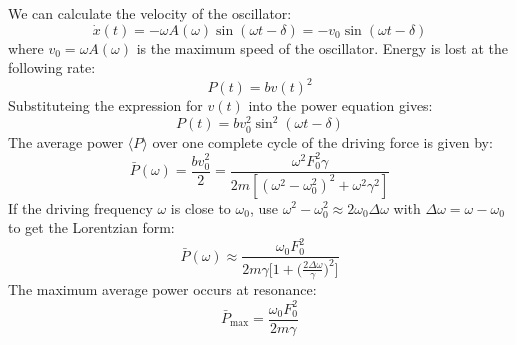 \documentclass[11pt]{report}
\begin{document}
\begin{definition} 
    We can calculate the velocity of the oscillator:
    \begin{equation}
        \dot{x}(t) = -\omega A(\omega) \sin(\omega t - \delta) = -v_0 \sin(\omega t - \delta)
    \end{equation}
    where \( v_0 = \omega A(\omega) \) is the maximum speed of the oscillator. Energy is lost at the following rate:
    \begin{equation}
        P(t) = b v(t)^2 
    \end{equation}
    Substituteing the expression for \( v(t) \) into the power equation gives:
    $$
        P(t) = b v_0^2 \sin^2(\omega t - \delta)
    $$
    The average power \( \langle P \rangle \) over one complete cycle of the driving force is given by:
   \begin{equation}
        \bar{P}(\omega) = \frac{b v_0^2}{2} = \frac{\omega^2 F_0^2 \gamma}{2m \left[(\omega^2 - \omega_0^2)^2 + \omega^2 \gamma^2\right]}
   \end{equation}
    If the driving frequency \( \omega \) is close to \( \omega_0 \), use $\omega^2 - \omega_0^2 \approx 2\omega_0\Delta \omega$ with $\Delta \omega = \omega - \omega_0$ to get the Lorentzian form:
    \begin{equation}
        \bar{P}(\omega) \approx \frac{\omega_0 F_0^2}{2m \gamma \Big[ 1 + \big(\tfrac{2\Delta \omega}{\gamma}\big)^2 \Big]}
    \end{equation}
    The maximum average power occurs at resonance:
    \begin{equation}
        \bar{P}_{\text{max}} = \frac{\omega_0 F_0^2}{2m \gamma}
    \end{equation}
\end{definition}
\end{document}
